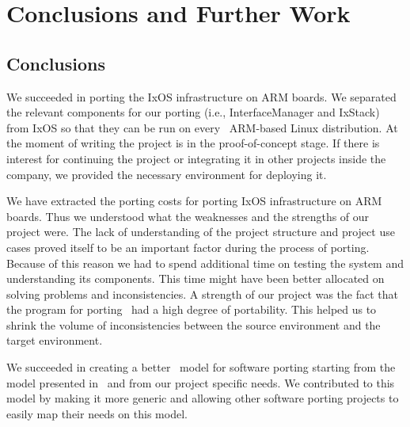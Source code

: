 \chapter{Conclusions and Further Work}

\section{Conclusions}


We succeeded in porting the IxOS infrastructure on ARM boards. We separated the
relevant components for our porting (i.e., InterfaceManager and IxStack) from
IxOS so that they can be run on every~ ARM-based Linux distribution. At the
moment of writing the project is in the proof-of-concept stage. If there is
interest for continuing the project or integrating it in other projects inside
the company, we provided the necessary environment for deploying it.~

We have extracted the porting costs for porting IxOS infrastructure on ARM
boards. Thus we understood what the weaknesses and the strengths of our project
were. The lack of understanding of the project structure and project use cases
proved itself to be an important factor during the process of porting. Because
of this reason we had to spend additional time on testing the system and
understanding its components. This time might have been better allocated on
solving problems and inconsistencies. A strength of our project was the fact
that the program for porting~ had a high degree of portability. This helped us to
shrink the volume of inconsistencies between the source environment and the
target environment.

We succeeded in creating a better~ model for software porting starting from the
model presented in~\cite{hakuta,tanaka} and from our project specific needs. We
contributed to this model by making it more generic and allowing other software
porting projects to easily map their needs on this model.~

